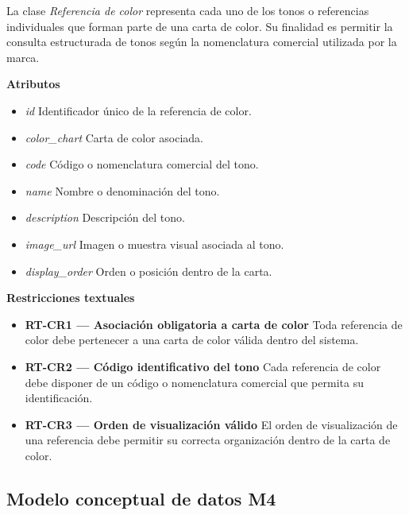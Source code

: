 La clase \textit{Referencia de color} representa cada uno de los tonos o referencias individuales que forman parte de una carta de color. Su finalidad es permitir la consulta estructurada de tonos según la nomenclatura comercial utilizada por la marca.

\textbf{Atributos}

\begin{itemize}
      \item \textit{id}
            Identificador único de la referencia de color.
      \item \textit{color\_chart}
            Carta de color asociada.
      \item \textit{code}
            Código o nomenclatura comercial del tono.
      \item \textit{name}
            Nombre o denominación del tono.
      \item \textit{description}
            Descripción del tono.
      \item \textit{image\_url}
            Imagen o muestra visual asociada al tono.
      \item \textit{display\_order}
            Orden o posición dentro de la carta.
\end{itemize}

\textbf{Restricciones textuales}

\begin{itemize}
      \item \textbf{RT-CR1 — Asociación obligatoria a carta de color}
            Toda referencia de color debe pertenecer a una carta de color válida dentro del sistema.
      \item \textbf{RT-CR2 — Código identificativo del tono}
            Cada referencia de color debe disponer de un código o nomenclatura comercial que permita su identificación.
      \item \textbf{RT-CR3 — Orden de visualización válido}
            El orden de visualización de una referencia debe permitir su correcta organización dentro de la carta de color.
\end{itemize}

\subsection{Modelo conceptual de datos M4}

